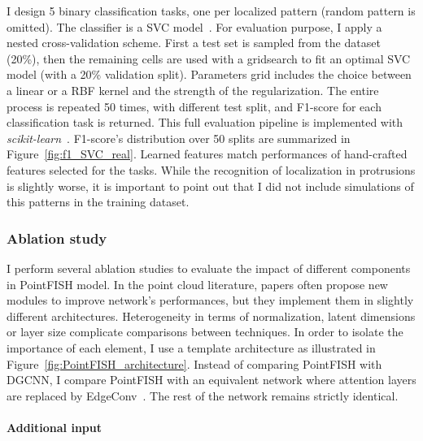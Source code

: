 I design 5 binary classification tasks, one per localized pattern (random pattern is omitted).
The classifier is a SVC model~\cite{chang2011libsvm}.
For evaluation purpose, I apply a nested cross-validation scheme.
First a test set is sampled from the dataset (20\%), then the remaining cells are used with a gridsearch to fit an optimal SVC model (with a 20\% validation split).
Parameters grid includes the choice between a linear or a RBF kernel and the strength of the regularization.
The entire process is repeated 50 times, with different test split, and F1-score for each classification task is returned.
This full evaluation pipeline is implemented with \emph{scikit-learn}~\cite{scikit-learn}.
F1-score's distribution over 50 splits are summarized in Figure~\ref{fig:f1_SVC_real}.
Learned features match performances of hand-crafted features selected for the tasks.
While the recognition of localization in protrusions is slightly worse, it is important to point out that I did not include simulations of this patterns in the training dataset.

\subsubsection{Ablation study}

I perform several ablation studies to evaluate the impact of different components in PointFISH model.
In the point cloud literature, papers often propose new modules to improve network's performances, but they implement them in slightly different architectures.
Heterogeneity in terms of normalization, latent dimensions or layer size complicate comparisons between techniques.
In order to isolate the importance of each element, I use a template architecture as illustrated in Figure~\ref{fig:PointFISH_architecture}.
Instead of comparing PointFISH with DGCNN, I compare PointFISH with an equivalent network where attention layers are replaced by EdgeConv~\cite{Wang_2019}.
The rest of the network remains strictly identical.

\paragraph{Additional input}

